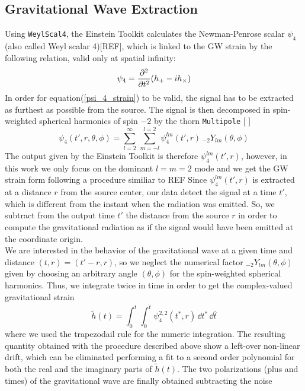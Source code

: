 \subsection{Gravitational Wave Extraction}
\label{gw_extraction}
Using \texttt{WeylScal4}, the Einstein Toolkit calculates the  Newman-Penrose scalar $\psi_4$ (also called Weyl scalar 4)[REF], which is linked to the GW strain by the following relation, valid only at spatial infinity:
\begin{equation}
\label{psi_4_strain}
\psi_{4} = \pdv[2]{}{t} \qty(h_{+} - i h_{\times})
\end{equation}
In order for equation(\ref{psi_4_strain}) to be valid, the signal has to be extracted as furthest as possible from the source.
The signal is then decomposed in spin-weighted spherical harmonics of spin $ - 2$ by the thorn \texttt{Multipole} [%
] 
\[
\psi_4 (t',r,\theta,\phi)= \sum_{l=2} ^{\infty} \, \sum _{m=-l} ^{l=2} \psi^{lm} _4 (t',r) \, _{-2} Y _{lm} (\theta, \phi) 
\]
The output given by the Einstein Toolkit is therefore $\psi_{4} ^{lm} (t',r)$, however, in this work we only focus on the dominant $l = m = 2$ mode and we get the GW strain form following a procedure similiar to REF%
Since $\psi^{lm} _4 (t',r)$ is extracted at a distance $r$ from the source center,  our data detect the signal at a time $t'$, which is different from the instant when the radiation was emitted.
So, we subtract from the output time $t'$ the distance from the source $r$
in order to compute the gravitational radiation as if the signal would have been emitted at the coordinate origin.\\
We are interested in the behavior of the gravitational wave at a given time and distance $(t,r) = (t'-r,r)$, so we neglect the numerical factor $_{-2} Y _{lm} (\theta, \phi)$ given by choosing an arbitrary angle $(\theta,\phi)$ for the spin-weighted spherical harmonics.
Thus, we integrate twice in time in order to get the complex-valued gravitational strain
\[
\tilde{h}(t) = \int _0 ^{t} \int _0 ^{\hat{t}} \psi_4 ^{2,2} (t^{*},r)
\, \dd t^{*} \,  \dd \hat{t}
\]
where we used the trapezodail rule for the numeric integration.
The resulting quantity obtained with the procedure described above show a left-over non-linear drift, which can be eliminated  performing a fit to a second order polynomial for both the real and the imaginary parts of $\tilde{h}(t)$.
The two polarizations (plus and times) of the gravitational wave are finally obtained subtracting the noise
